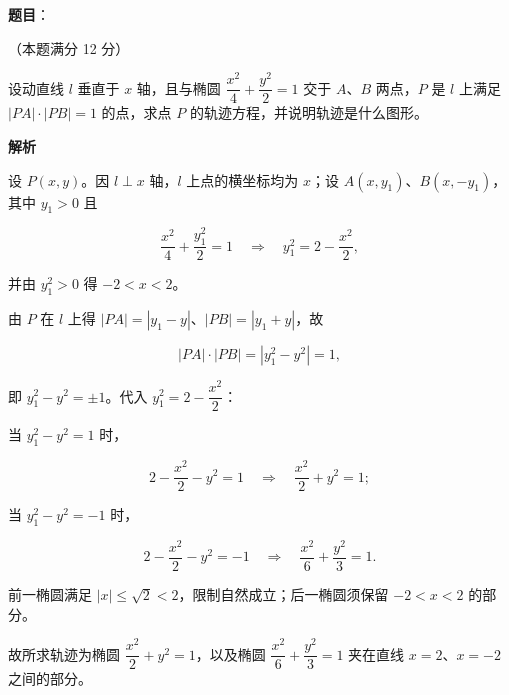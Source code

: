 \begin{answer}

\textbf{题目}：

（本题满分 12 分）

设动直线 $l$ 垂直于 $x$ 轴，且与椭圆 $\dfrac{x^{2}}{4}+\dfrac{y^{2}}{2}=1$ 交于 $A$、$B$ 两点，$P$ 是 $l$ 上满足 $|PA|\cdot|PB|=1$ 的点，求点 $P$ 的轨迹方程，并说明轨迹是什么图形。

\textbf{解析}

设 $P(x,y)$。因 $l\perp x$ 轴，$l$ 上点的横坐标均为 $x$；设 $A(x,y_{1})$、$B(x,-y_{1})$，其中 $y_{1}>0$ 且

\nopagebreak[4]
\[
\frac{x^{2}}{4}+\frac{y_{1}^{2}}{2}=1 \quad\Longrightarrow\quad y_{1}^{2}=2-\frac{x^{2}}{2},
\]

并由 $y_{1}^{2}>0$ 得 $-2<x<2$。

由 $P$ 在 $l$ 上得 $|PA|=|y_{1}-y|$、$|PB|=|y_{1}+y|$，故

\nopagebreak[4]
\[
|PA|\cdot|PB|=|y_{1}^{2}-y^{2}|=1,
\]

即 $y_{1}^{2}-y^{2}=\pm 1$。代入 $y_{1}^{2}=2-\dfrac{x^{2}}{2}$：

当 $y_{1}^{2}-y^{2}=1$ 时，

\nopagebreak[4]
\[
2-\frac{x^{2}}{2}-y^{2}=1 \quad\Longrightarrow\quad \frac{x^{2}}{2}+y^{2}=1;
\]

当 $y_{1}^{2}-y^{2}=-1$ 时，

\nopagebreak[4]
\[
2-\frac{x^{2}}{2}-y^{2}=-1 \quad\Longrightarrow\quad \frac{x^{2}}{6}+\frac{y^{2}}{3}=1.
\]

前一椭圆满足 $|x|\le\sqrt{2}<2$，限制自然成立；后一椭圆须保留 $-2<x<2$ 的部分。

故所求轨迹为椭圆 $\dfrac{x^{2}}{2}+y^{2}=1$，以及椭圆 $\dfrac{x^{2}}{6}+\dfrac{y^{2}}{3}=1$ 夹在直线 $x=2$、$x=-2$ 之间的部分。


\end{answer}

